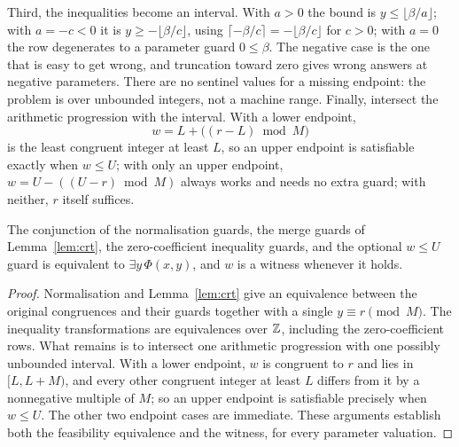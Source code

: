 Third, the inequalities become an interval. With $a>0$ the bound is
$y\le\lfloor\beta/a\rfloor$; with $a=-c<0$ it is $y\ge-\lfloor\beta/c\rfloor$,
using $\lceil-\beta/c\rceil=-\lfloor\beta/c\rfloor$ for $c>0$; with $a=0$ the
row degenerates to a parameter guard $0\le\beta$. The negative case is the one
that is easy to get wrong, and truncation toward zero gives wrong answers at
negative parameters. There are no sentinel values for a missing endpoint: the
problem is over unbounded integers, not a machine range. Finally, intersect the
arithmetic progression with the interval. With a lower endpoint,
\[
 w=L+\bigl((r-L)\bmod M\bigr)
\]
is the least congruent integer at least $L$, so an upper endpoint is satisfiable
exactly when $w\le U$; with only an upper endpoint,
$w=U-((U-r)\bmod M)$ always works and needs no extra guard; with neither, $r$
itself suffices.

\begin{theorem}\label{thm:projection}
The conjunction of the normalisation guards, the merge guards of
Lemma~\ref{lem:crt}, the zero-coefficient inequality guards, and the optional
$w\le U$ guard is equivalent to $\exists y\,\Phi(x,y)$, and $w$ is a witness
whenever it holds.
\end{theorem}

\begin{proof}
Normalisation and Lemma~\ref{lem:crt} give an equivalence between the original
congruences and their guards together with a single $y\equiv r\pmod M$. The
inequality transformations are equivalences over $\mathbb{Z}$, including the
zero-coefficient rows. What remains is to intersect one arithmetic progression
with one possibly unbounded interval. With a lower endpoint, $w$ is congruent to
$r$ and lies in $[L,L+M)$, and every other congruent integer at least $L$
differs from it by a nonnegative multiple of $M$; so an upper endpoint is
satisfiable precisely when $w\le U$. The other two endpoint cases are immediate.
These arguments establish both the feasibility equivalence and the witness, for
every parameter valuation.
\end{proof}

